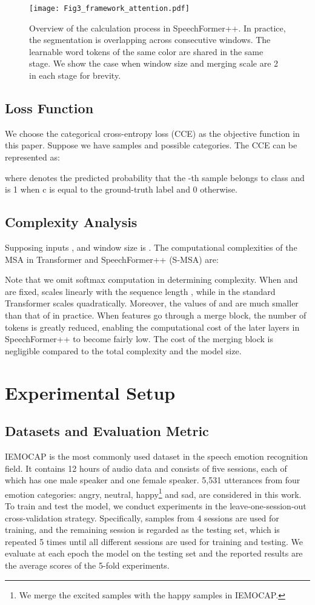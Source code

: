 \documentclass[lettersize,journal]{IEEEtran}
\begin{document}
\begin{figure}[t]
\centering
\texttt{[image: Fig3\_framework\_attention.pdf]}
\caption{Overview of the calculation process in SpeechFormer++. In practice, the segmentation is overlapping across consecutive windows. The learnable word tokens of the same color are shared in the same stage. We show the case when window size and merging scale are 2 in each stage for brevity.
}
\label{fig_4}
\end{figure}

\subsection{Loss Function}
We choose the categorical cross-entropy loss (CCE) as the objective function in this paper. Suppose we have  samples and  possible categories. The CCE can be represented as:

where  denotes the predicted probability that the -th sample belongs to class  and  is 1 when c is equal to the ground-truth label and 0 otherwise.

\subsection{Complexity Analysis}
Supposing inputs ,  and window size is . The computational complexities of the MSA in Transformer and SpeechFormer++ (S-MSA) are:


Note that we omit softmax computation in determining complexity. When  and  are fixed,  scales linearly with the sequence length , while  in the standard Transformer scales quadratically. Moreover, the values of  and  are much smaller than that of  in practice. When features go through a merge block, the number of tokens is greatly reduced, enabling the computational cost of the later layers in SpeechFormer++ to become fairly low. The cost of the merging block is negligible compared to the total complexity and the model size.

\section{Experimental Setup}

\subsection{Datasets and Evaluation Metric}
IEMOCAP \cite{IEMOCAP} is the most commonly used dataset in the speech emotion recognition field. It contains 12 hours of audio data and consists of five sessions, each of which has one male speaker and one female speaker. 5,531 utterances from four emotion categories: angry, neutral, happy\footnote{We merge the excited samples with the happy samples in IEMOCAP.} and sad, are considered in this work. To train and test the model, we conduct experiments in the leave-one-session-out cross-validation strategy. Specifically, samples from 4 sessions are used for training, and the remaining session is regarded as the testing set, which is repeated 5 times until all different sessions are used for training and testing. We evaluate at each epoch the model on the testing set and the reported results are the average scores of the 5-fold experiments.
\end{document}
